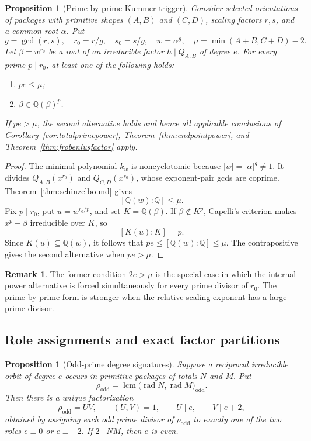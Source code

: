 \documentclass[11pt]{article}
\numberwithin{equation}{section}
\newtheorem{proposition}[theorem]{Proposition}
\theoremstyle{definition}
\newtheorem{remark}[theorem]{Remark}
\newcommand{\Q}{\mathbb Q}
\begin{document}
\begin{proposition}[Prime-by-prime Kummer trigger]
\label{prop:largetrigger}
Consider selected orientations of packages with primitive shapes \((A,B)\)
and \((C,D)\), scaling factors \(r,s\), and a common root \(\alpha\).  Put
\[
 g=\gcd(r,s),\quad r_0=r/g,\quad s_0=s/g,
 \quad w=\alpha^g,
 \quad \mu=\min(A+B,C+D)-2.
\]
Let \(\beta=w^{r_0}\) be a root of an irreducible factor
\(h\mid Q_{A,B}\) of degree \(e\).  For every prime \(p\mid r_0\), at
least one of the following holds:
\begin{enumerate}[label=(\roman*)]
\item \(pe\leq\mu\);
\item \(\beta\in\Q(\beta)^p\).
\end{enumerate}
If \(pe>\mu\), the second alternative holds and hence all applicable
conclusions of Corollary~\ref{cor:totalprimepower},
Theorem~\ref{thm:endpointpower}, and
Theorem~\ref{thm:frobeniusfactor} apply.
\end{proposition}

\begin{proof}
The minimal polynomial \(k_w\) is noncyclotomic because
\(|w|=|\alpha|^g\neq1\).  It divides
\(Q_{A,B}(x^{r_0})\) and \(Q_{C,D}(x^{s_0})\), whose exponent-pair gcds
are coprime.  Theorem~\ref{thm:schinzelbound} gives
\[
 [\Q(w):\Q]\leq\mu.
\]
Fix \(p\mid r_0\), put \(u=w^{r_0/p}\), and set
\(K=\Q(\beta)\).  If \(\beta\notin K^p\), Capelli's criterion makes
\(x^p-\beta\) irreducible over \(K\), so
\[
 [K(u):K]=p.
\]
Since \(K(u)\subseteq\Q(w)\), it follows that
\(pe\leq[\Q(w):\Q]\leq\mu\).  The contrapositive gives the second
alternative when \(pe>\mu\).
\end{proof}

\begin{remark}
The former condition \(2e>\mu\) is the special case in which the
internal-power alternative is forced simultaneously for every prime divisor
of \(r_0\).  The prime-by-prime form is stronger when the relative scaling
exponent has a large prime divisor.
\end{remark}

\subsection{Role assignments and exact factor partitions}

\begin{proposition}[Odd-prime degree signatures]
\label{prop:rolesignature}
Suppose a reciprocal irreducible orbit of degree \(e\) occurs in primitive
packages of totals \(N\) and \(M\).  Put
\[
 \rho_{\mathrm{odd}}
 =\operatorname{lcm}\bigl(\operatorname{rad}N,
                           \operatorname{rad}M\bigr)_{\mathrm{odd}}.
\]
Then there is a unique factorization
\begin{equation}
 \rho_{\mathrm{odd}}=UV,
 \qquad (U,V)=1,
 \qquad U\mid e,
 \qquad V\mid e+2,
 \label{eq:15-7}
\end{equation}
obtained by assigning each odd prime divisor of \(\rho_{\mathrm{odd}}\) to
exactly one of the two roles \(e\equiv0\) or \(e\equiv-2\).  If
\(2\mid NM\), then \(e\) is even.
\end{proposition}
\end{document}
